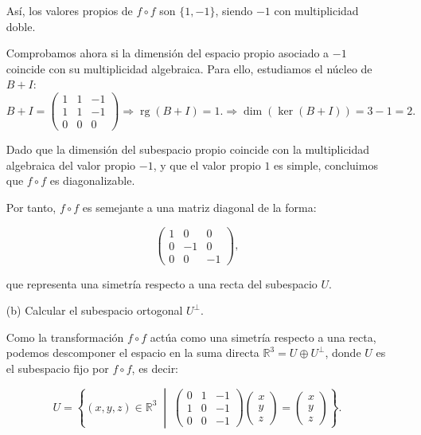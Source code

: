 \documentclass[12pt]{article}
\begin{document}
\begin{ejercicio}[4 puntos]
\begin{enumerate}
					Así, los valores propios de \( f \circ f \) son \( \{1, -1\} \), siendo \( -1 \) con multiplicidad doble.
					
					\medskip
					
					Comprobamos ahora si la dimensión del espacio propio asociado a \( -1 \) coincide con su multiplicidad algebraica. Para ello, estudiamos el núcleo de \( B + I \):
					\begin{equation*}
						B + I = 
						\begin{pmatrix}
							1 & 1 & -1 \\
							1 & 1 & -1 \\
							0 & 0 & 0
						\end{pmatrix} \Rightarrow \operatorname{rg}(B + I) = 1.
						\Longrightarrow \dim(\ker(B + I)) = 3 - 1 = 2.
					\end{equation*}
					
					
					Dado que la dimensión del subespacio propio coincide con la multiplicidad algebraica del valor propio \( -1 \), y que el valor propio \( 1 \) es simple, concluimos que \( f \circ f \) es diagonalizable.
					
					\medskip
					
					Por tanto, \( f \circ f \) es semejante a una matriz diagonal de la forma:
					
					\[
					\begin{pmatrix}
						1 & 0 & 0 \\
						0 & -1 & 0 \\
						0 & 0 & -1
					\end{pmatrix},
					\]
					
					que representa una simetría respecto a una recta del subespacio $U$.
				
			\item[(b)] Calcular el subespacio ortogonal $U^\perp$.
			
			Como la transformación \( f \circ f \) actúa como una simetría respecto a una recta, podemos descomponer el espacio en la suma directa \( \mathbb{R}^3 = U \oplus U^\perp \), donde \( U \) es el subespacio fijo por \( f \circ f \), es decir:
			
			\[
			U = \left\{ 
			(x, y, z) \in \mathbb{R}^3 \;\middle|\; 
			\begin{pmatrix}
				0 & 1 & -1 \\
				1 & 0 & -1 \\
				0 & 0 & -1
			\end{pmatrix}
			\begin{pmatrix}
				x \\ y \\ z
			\end{pmatrix}
			=
			\begin{pmatrix}
				x \\ y \\ z
			\end{pmatrix}
			\right\}.
			\]
			

\end{enumerate}
\end{ejercicio}
\end{document}
